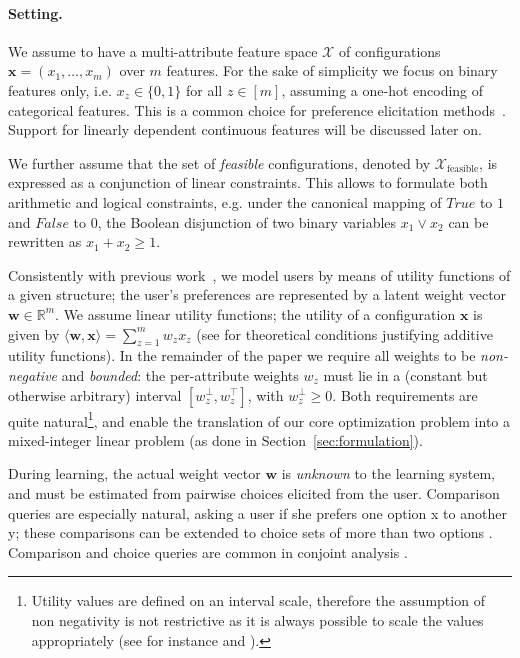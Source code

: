 \documentclass{article}
\renewcommand\[{\begin{equation}}
\renewcommand\]{\end{equation}}
\newcommand{\bbR}{\mathbb{R}}
\newcommand{\calvar}[1]{\ensuremath{\mathcal{#1}}}
\newcommand{\calX}{\calvar{X}}
\newcommand{\vecvar}[1]{\ensuremath{\boldsymbol{#1}}}
\newcommand{\vw}{\vecvar{w}}
\newcommand{\vx}{\vecvar{x}}
\newcommand{\andrea}[1]{{\bf \textcolor{blue}{{\fbox{Andrea:} #1}}}}
\begin{document}
\paragraph{Setting.} We assume to have a multi-attribute feature space
$\calX$ of configurations $\vx = (x_1, \ldots, x_m)$ over $m$
features. For the sake of simplicity we focus on binary features only,
i.e. $x_z\in\{0,1\}$ for all $z\in[m]$, assuming a one-hot encoding of
categorical features. This is a common choice for preference
elicitation methods~\cite{guo2010real,viappiani2010optimal}. Support
for linearly dependent continuous features will be discussed later on.

We further assume that the set of {\em feasible} configurations, denoted by
$\calX_\text{feasible}$, is expressed as
a conjunction of linear constraints. This allows to formulate both arithmetic
and logical constraints,
e.g. under the canonical mapping of $True$ to $1$ and $False$ to $0$, the
Boolean disjunction of two binary variables $x_1 \lor x_2$ can be rewritten as
$x_1 + x_2 \ge 1$.

Consistently with previous work~\cite{guo2010real,viappiani2010optimal}, 
we model users by means of utility functions of a given structure; the user's preferences are represented by a latent weight
vector $\vw\in\bbR^m$.
We assume linear utility functions; the utility of a configuration $\vx$ is given by
$\langle \vw, \vx \rangle = \sum_{z=1}^m w_z x_z$
(see \cite{keeney1976} for theoretical conditions justifying additive utility functions). 
In the remainder of the paper we
require all weights to be {\em non-negative} and {\em bounded}: the per-attribute
weights $w_z$ must lie in a (constant but otherwise arbitrary) interval
$[w^\bot_z, w^\top_z]$, with $w^\bot_z \ge 0$. 
Both requirements are quite natural\footnote{Utility values are defined on an
interval scale, therefore the assumption of non negativity is not restrictive as it is always possible to scale the values appropriately (see for instance \cite{Torra2007} and \cite{keeney1976}).}, and enable the translation of our core optimization problem into a
mixed-integer linear problem (as done in Section~\ref{sec:formulation}).

During learning, the actual weight vector $\vw$ is {\em unknown} to the
learning system, and must be estimated from pairwise choices elicited from the
user.
Comparison queries are especially natural, asking a user if she prefers one option x to another y;
these comparisons can be extended to choice sets of more than two options \cite{viappiani2009,viappiani2010optimal}.
Comparison and choice queries are common in conjoint analysis \cite{louviere2000,toubia2004}.
\end{document}
